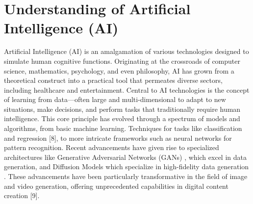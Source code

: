 \documentclass[11pt,a4paper,oneside]{report}
\begin{document}
\section{Understanding of Artificial Intelligence (AI)}
Artificial Intelligence (AI) is an amalgamation of various technologies designed to simulate human cognitive functions. 
Originating at the crossroads of computer science, mathematics, psychology, and even philosophy, 
AI has grown from a theoretical construct into a practical tool that permeates diverse sectors, 
including healthcare and entertainment. 
Central to AI technologies is the concept of learning from data—often large and multi-dimensional to adapt to new situations, make decisions, and perform tasks that traditionally require human intelligence. 
This core principle has evolved through a spectrum of models and algorithms, from basic machine learning. 
Techniques for tasks like classification and regression [8], to more intricate frameworks such as neural networks for pattern recognition. 
Recent advancements have given rise to specialized architectures like Generative Adversarial Networks (GANs) \cite{granot2022drop}, which excel in data generation, and Diffusion Models which specialize in high-fidelity data generation \cite{rombach2022high}. 
These advancements have been particularly transformative in the field of image and video generation, offering unprecedented capabilities in digital content creation [9]. 
\end{document}
